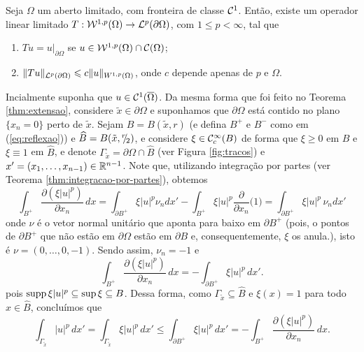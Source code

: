 \begin{tbox} \label{thm:traco-1}
    Seja $\Omega$ um aberto limitado, com fronteira de classe $\mathcal{C}^1$. Então, existe um operador linear limitado $T : \mathcal{W}^{1,p}(\Omega) \to \mathcal{L}^p(\partial \Omega)$, com $1 \leqslant p < \infty$, tal que
    \begin{enumerate}[leftmargin=*, label=\textbf{(\alph*)}]
        \item $Tu = u \big|_{\partial \Omega}$ se $u \in \mathcal{W}^{1,p}(\Omega) \cap \mathcal{C}(\Omega)$;
        \item $\Vert Tu \Vert_{\mathcal{L}^p(\partial\Omega)} \leqslant c \Vert u \Vert_{W^{1,p}(\Omega)}$, onde $c$ depende apenas de $p$ e $\Omega$.
    \end{enumerate}
\end{tbox} 
\begin{prf}
    Incialmente suponha que $u \in \mathcal{C}^1(\overline{\Omega})$. Da mesma forma que foi feito no Teorema \ref{thm:extensao}, considere $\tilde x \in \partial\Omega$ e suponhamos que $\partial\Omega$ está contido no plano $\{x_n = 0\}$ perto de $\tilde x$.
    Sejam $B = B(\tilde x, r)$ (e defina $B^+$ e $B^-$ como em (\ref{eq:reflexao})) e $\widehat B = B(\tilde x, {}^{r}\!\!/\!_{2})$,
    e considere $\xi \in \mathcal{C}^{\infty}_c(B)$ de forma que $\xi \geqslant 0$ em $B$ e $\xi \equiv 1$ em $\widehat B$, e denote $\Gamma_{\tilde x} = \partial \Omega \cap \widehat B$ (ver Figura \ref{fig:tracos}) e $x' = (x_1,\dots,x_{n-1}) \in \mathbb{R}^{n-1}$.
    Note que, utilizando integração por partes (ver Teorema \ref{thm:integracao-por-partes}), obtemos
    \[
        \int_{B^+} \dfrac{\partial (\xi |u|^p)}{\partial x_n}\,dx = \int_{\partial B^+} \xi |u|^p \nu_n dx' - \int_{B^+} \xi |u|^p \frac{\partial}{\partial x_n} \big( 1 \big) = \int_{\partial B^+} \xi |u|^p \, \nu_n dx'
    \]
    onde $\nu$ é o vetor normal unitário que aponta para baixo em $\partial B^+$ (pois, o pontos de $\partial B^+$ que não estão em $\partial \Omega$ estão em $\partial B$ e, consequentemente, $\xi$ os anula.), isto é $\nu =  (0,\dots,0,-1)$. Sendo assim, $\nu_n = -1$ e 
    \[
        \int_{B^+} \dfrac{\partial (\xi |u|^p)}{\partial x_n} \,dx = -\int_{\partial B^+} \xi |u|^p \,dx'.
    \]
    pois $\mathrm{supp}\, \xi |u|^p \subseteq \sup \xi \subseteq B$.
    Dessa forma, como $\Gamma_{\tilde x} \subseteq \hat B$ e $\xi(x) = 1$ para todo $x \in \hat B$, concluímos que
    \[
        \int_{\Gamma_{\tilde x}} |u|^p \,dx' = \int_{\Gamma_{\tilde x}} \xi|u|^p \,dx' \leqslant \int_{\partial B^+} \xi|u|^p \,dx' = -\int_{B^+} \dfrac{\partial (\xi |u|^p)}{\partial x_n} \,dx.
    \]

\end{prf}
